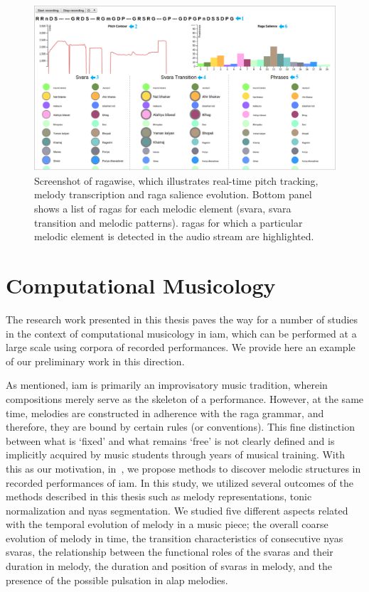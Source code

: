 \begin{figure}
	\begin{center}
		\includegraphics[width=\figSizeHundred]{ch08_applications/figures/ragawise.pdf}
	\end{center}
	\caption[Screenshot of \gls{ragawise}]{Screenshot of \gls{ragawise}, which illustrates real-time pitch tracking, melody transcription and \gls{raga} salience evolution. Bottom panel shows a list of \glspl{raga} for each melodic element (\gls{svara}, \gls{svara} transition and melodic patterns). \Glspl{raga} for which a particular melodic element is detected in the audio stream are highlighted.}
	\label{fig:ragawise}
\end{figure}


\section{Computational Musicology}

The research work presented in this thesis paves the way for a number of studies in the context of computational musicology in \gls{iam}, which can be performed at a large scale using corpora of recorded performances. We provide here an example of our preliminary work in this direction. 

As mentioned, \gls{iam} is primarily an improvisatory music tradition, wherein compositions merely serve as the skeleton of a performance. However, at the same time, melodies are constructed in adherence with the \gls{raga} grammar, and therefore, they are bound by certain rules (or conventions). This fine distinction between what is `fixed' and what remains `free' is not clearly defined and is implicitly acquired by music students through years of musical training. With this as our motivation, in~\cite{kaustuv_ismir_2016}, we propose methods to discover melodic structures in recorded performances of \gls{iam}. In this study, we utilized several outcomes of the methods described in this thesis such as melody representations, tonic normalization and \gls{nyas} segmentation. We studied five different aspects related with the temporal evolution of melody in a music piece; the overall coarse evolution of melody in time, the transition characteristics of consecutive \gls{nyas} \glspl{svara}, the relationship between the functional roles of the \glspl{svara} and their duration in melody, the duration and position of \glspl{svara} in melody, and the presence of the possible pulsation in \gls{alap} melodies. 

